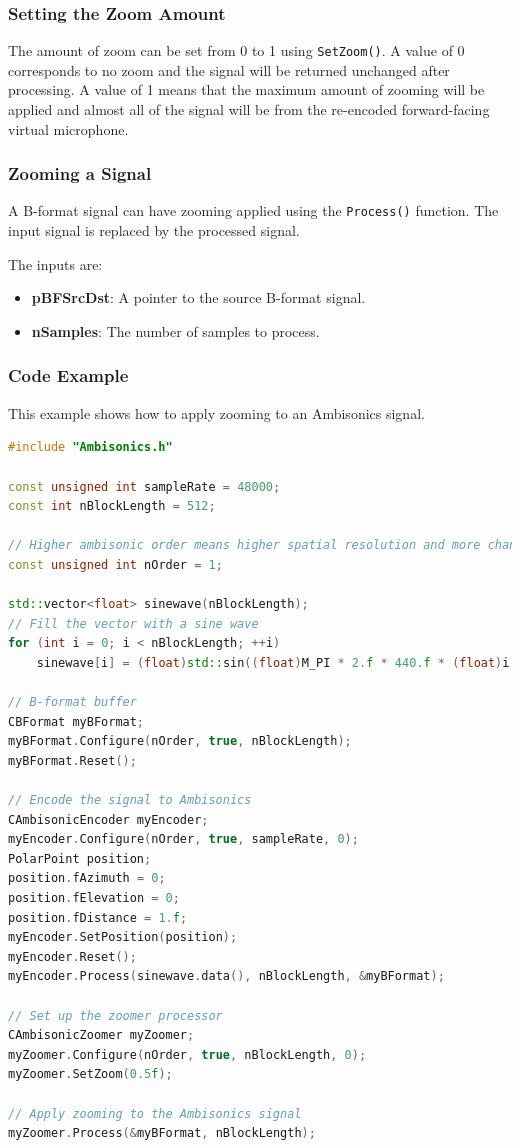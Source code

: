 \documentclass[12pt]{report}
\newcommand{\code}[1]{\texttt{#1}}
\begin{document}
\subsubsection{Setting the Zoom Amount}

The amount of zoom can be set from 0 to 1 using \code{SetZoom()}. A value of 0 corresponds to no zoom and the signal will be returned unchanged after processing.
A value of 1 means that the maximum amount of zooming will be applied and almost all of the signal will be from the re-encoded forward-facing virtual microphone.

\subsubsection{Zooming a Signal}

A B-format signal can have zooming applied using the \code{Process()} function. The input signal is replaced by the processed signal.

The inputs are:
\begin{itemize}
    \item \textbf{pBFSrcDst}: A pointer to the source B-format signal.
    \item \textbf{nSamples}: The number of samples to process.
\end{itemize}

\subsubsection{Code Example}

This example shows how to apply zooming to an Ambisonics signal.

\begin{lstlisting}[language=C++]
#include "Ambisonics.h"

const unsigned int sampleRate = 48000;
const int nBlockLength = 512;

// Higher ambisonic order means higher spatial resolution and more channels required
const unsigned int nOrder = 1;

std::vector<float> sinewave(nBlockLength);
// Fill the vector with a sine wave
for (int i = 0; i < nBlockLength; ++i)
    sinewave[i] = (float)std::sin((float)M_PI * 2.f * 440.f * (float)i / (float)sampleRate);

// B-format buffer
CBFormat myBFormat;
myBFormat.Configure(nOrder, true, nBlockLength);
myBFormat.Reset();

// Encode the signal to Ambisonics
CAmbisonicEncoder myEncoder;
myEncoder.Configure(nOrder, true, sampleRate, 0);
PolarPoint position;
position.fAzimuth = 0;
position.fElevation = 0;
position.fDistance = 1.f;
myEncoder.SetPosition(position);
myEncoder.Reset();
myEncoder.Process(sinewave.data(), nBlockLength, &myBFormat);

// Set up the zoomer processor
CAmbisonicZoomer myZoomer;
myZoomer.Configure(nOrder, true, nBlockLength, 0);
myZoomer.SetZoom(0.5f);

// Apply zooming to the Ambisonics signal
myZoomer.Process(&myBFormat, nBlockLength);
\end{lstlisting}
\end{document}
